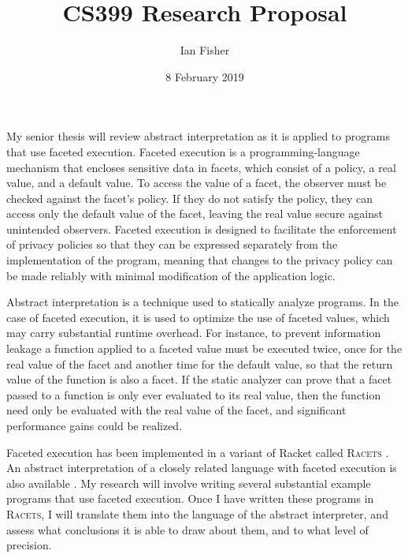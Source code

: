 \documentclass{article}
\title{CS399 Research Proposal}
\author{Ian Fisher}
\date{8 February 2019}
\begin{document}
\maketitle

My senior thesis will review abstract interpretation as it is applied to programs that use faceted execution. Faceted execution is a programming-language mechanism that encloses sensitive data in facets, which consist of a policy, a real value, and a default value. To access the value of a facet, the observer must be checked against the facet's policy. If they do not satisfy the policy, they can access only the default value of the facet, leaving the real value secure against unintended observers. Faceted execution is designed to facilitate the enforcement of privacy policies so that they can be expressed separately from the implementation of the program, meaning that changes to the privacy policy can be made reliably with minimal modification of the application logic.

Abstract interpretation is a technique used to statically analyze programs. In the case of faceted execution, it is used to optimize the use of faceted values, which may carry substantial runtime overhead. For instance, to prevent information leakage a function applied to a faceted value must be executed twice, once for the real value of the facet and another time for the default value, so that the return value of the function is also a facet. If the static analyzer can prove that a facet passed to a function is only ever evaluated to its real value, then the function need only be evaluated with the real value of the facet, and significant performance gains could be realized.

Faceted execution has been implemented in a variant of Racket called \textsc{Racets} \cite{racets}. An abstract interpretation of a closely related language with faceted execution is also available \cite{abstract-inter}. My research will involve writing several substantial example programs that use faceted execution. Once I have written these programs in \textsc{Racets}, I will translate them into the language of the abstract interpreter, and assess what conclusions it is able to draw about them, and to what level of precision.


\end{document}
